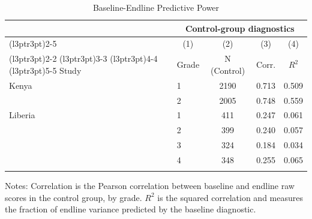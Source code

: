 \begin{table}[H]
\centering
\caption{Baseline-Endline Predictive Power}
\label{tab:signal_quality}
\begin{threeparttable}
\begin{tabular}[t]{llccc}
\toprule
\multicolumn{1}{c}{ } & \multicolumn{4}{c}{Control-group diagnostics} \\
\cmidrule(l{3pt}r{3pt}){2-5}
\multicolumn{1}{c}{ } & \multicolumn{1}{c}{(1)} & \multicolumn{1}{c}{(2)} & \multicolumn{1}{c}{(3)} & \multicolumn{1}{c}{(4)} \\
\cmidrule(l{3pt}r{3pt}){2-2} \cmidrule(l{3pt}r{3pt}){3-3} \cmidrule(l{3pt}r{3pt}){4-4} \cmidrule(l{3pt}r{3pt}){5-5}
Study & Grade & N (Control) & Corr. & \(R^2\) \\
\midrule
Kenya & 1 & 2190 &  0.713 &  0.509 \\
 & 2 & 2005 &  0.748 &  0.559 \\
\addlinespace
Liberia & 1 & 411 &  0.247 &  0.061 \\
 & 2 & 399 &  0.240 &  0.057 \\
 & 3 & 324 &  0.184 &  0.034 \\
 & 4 & 348 &  0.255 &  0.065 \\
\addlinespace
\bottomrule
\end{tabular}
\begin{tablenotes}[para]
\item Notes: Correlation is the Pearson correlation between baseline and endline raw scores in the control group, by grade. \(R^2\) is the squared correlation and measures the fraction of endline variance predicted by the baseline diagnostic.
\end{tablenotes}
\end{threeparttable}
\end{table}
